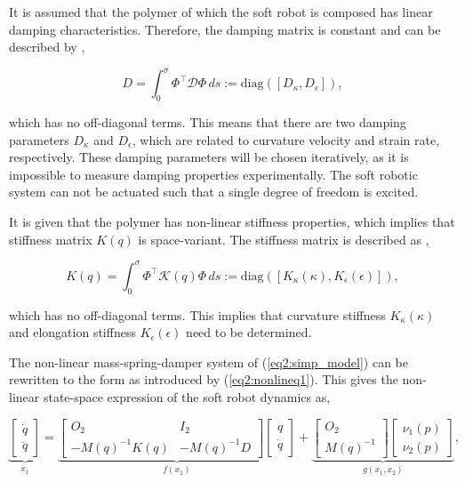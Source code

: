 {It is assumed that the polymer of which the soft robot is composed has linear damping characteristics. Therefore, the damping matrix is constant and can be described by \cite{Caasenbrood2020},

\begin{equation}
    D = \int_0^\sigma \Phi^\top \mathcal{D} \Phi \hspace{2pt} ds  := \text{diag}([D_\kappa, D_\epsilon]),
\end{equation}

which has no off-diagonal terms. This means that there are two damping parameters $D_\kappa$ and $D_\epsilon$, which are related to curvature velocity and strain rate, respectively. These damping parameters will be chosen iteratively, as it is impossible to measure damping properties experimentally. The soft robotic system can not be actuated such that a single degree of freedom is excited. 

It is given that the polymer has non-linear stiffness properties, which implies that stiffness matrix $K(q)$ is space-variant. The stiffness matrix is described as \cite{Caasenbrood2020},

\begin{equation}
    K(q) = \int_0^\sigma \Phi^\top \mathcal{K}(q) \Phi \hspace{2pt} ds := \text{diag}([K_\kappa(\kappa), K_\epsilon(\epsilon)]),
\end{equation}

which has no off-diagonal terms. This implies that curvature stiffness $K_\kappa(\kappa)$ and elongation stiffness $K_\epsilon(\epsilon)$ need to be determined.

The non-linear mass-spring-damper system of (\ref{eq2:simp_model}) can be rewritten to the form as introduced by (\ref{eq2:nonlineq1}). This gives the non-linear state-space expression of the soft robot dynamics as,


\begin{equation}
    \underbrace{\begin{bmatrix}\dot{q}\\ \ddot{q}  \end{bmatrix}}_{\dot{x}_1}   = \underbrace{  \begin{bmatrix} O_{2} & I_{2} \\ -M(q)^{-1}K(q)  & -M(q)^{-1} D \end{bmatrix}   \begin{bmatrix} q \\ \dot{q} \end{bmatrix} }_{f(x_1)}  +      \underbrace{ \begin{bmatrix} O_{2} \\ M(q)^{-1}   \end{bmatrix}       \begin{bmatrix} \nu_1(p) \\ \nu_2(p)  
    \end{bmatrix} }_{g(x_1,x_2)}, 
    \label{eq4:SS}
\end{equation}

}
